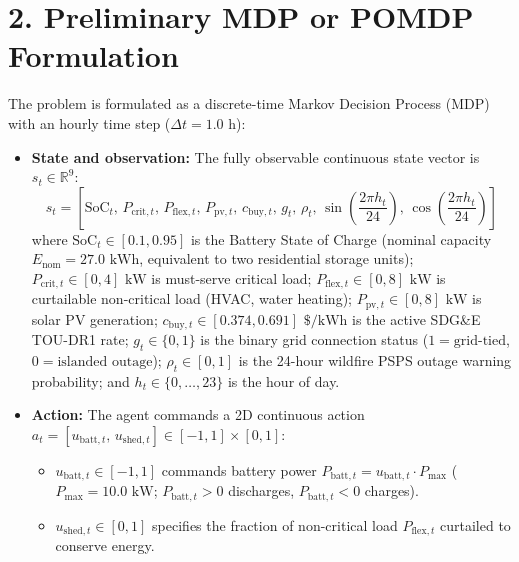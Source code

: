 \documentclass[11pt,letterpaper]{article}
\begin{document}
\section*{2. Preliminary MDP or POMDP Formulation}
The problem is formulated as a discrete-time Markov Decision Process (MDP) with an hourly time step ($\Delta t = 1.0\text{ h}$):

\begin{itemize}
  \item \textbf{State and observation:} The fully observable continuous state vector is $s_t \in \mathbb{R}^9$:
  \begin{equation*}
    s_t = \left[\text{SoC}_t,\, P_{\text{crit},t},\, P_{\text{flex},t},\, P_{\text{pv},t},\, c_{\text{buy},t},\, g_t,\, \rho_t,\, \sin\left(\frac{2\pi h_t}{24}\right),\, \cos\left(\frac{2\pi h_t}{24}\right)\right]
  \end{equation*}
  where $\text{SoC}_t \in [0.1, 0.95]$ is the Battery State of Charge (nominal capacity $E_{\text{nom}} = 27.0\text{ kWh}$, equivalent to two residential storage units); $P_{\text{crit},t} \in [0, 4]\text{ kW}$ is must-serve critical load; $P_{\text{flex},t} \in [0, 8]\text{ kW}$ is curtailable non-critical load (HVAC, water heating); $P_{\text{pv},t} \in [0, 8]\text{ kW}$ is solar PV generation; $c_{\text{buy},t} \in [0.374, 0.691]\text{ \$/kWh}$ is the active SDG\&E TOU-DR1 rate; $g_t \in \{0, 1\}$ is the binary grid connection status ($1 = \text{grid-tied}$, $0 = \text{islanded outage}$); $\rho_t \in [0, 1]$ is the 24-hour wildfire PSPS outage warning probability; and $h_t \in \{0, \dots, 23\}$ is the hour of day.

  \item \textbf{Action:} The agent commands a 2D continuous action $a_t = [u_{\text{batt},t},\, u_{\text{shed},t}] \in [-1, 1] \times [0, 1]$:
  \begin{itemize}
    \item $u_{\text{batt},t} \in [-1, 1]$ commands battery power $P_{\text{batt},t} = u_{\text{batt},t} \cdot P_{\text{max}}$ ($P_{\text{max}} = 10.0\text{ kW}$; $P_{\text{batt},t} > 0$ discharges, $P_{\text{batt},t} < 0$ charges).
    \item $u_{\text{shed},t} \in [0, 1]$ specifies the fraction of non-critical load $P_{\text{flex},t}$ curtailed to conserve energy.
  \end{itemize}


\end{itemize}
\end{document}
